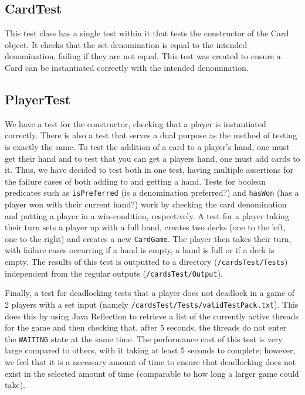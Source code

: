 \documentclass[a4paper, 11pt] {article}
\begin{document}
\subsection*{CardTest}
This test class has a single test within it that tests the constructor of the Card object. It checks that the set denomination is equal to the intended denomination, failing if they are not equal. This test was created to ensure a Card can be instantiated correctly with the intended denomination.

\subsection*{PlayerTest}
We have a test for the constructor, checking that a player is instantiated correctly. There is also a test that serves a dual purpose as the method of testing is exactly the same. To test the addition of a card to a player's hand, one must get their hand and to test that you can get a players hand, one must add cards to it. Thus, we have decided to test both in one test, having multiple assertions for the failure cases of both adding to and getting a hand.
Tests for boolean predicates such as \texttt{isPreferred} (is a denomination preferred?) and \texttt{hasWon} (has a player won with their current hand?) work by checking the card denomination and putting a player in a win-condition, respectively.
A test for a player taking their turn sets a player up with a full hand, creates two decks (one to the left, one to the right) and creates a new \texttt{CardGame}. The player then takes their turn, with failure cases occurring if a hand is empty, a hand is full or if a deck is empty. The results of this test is outputted to a directory (\texttt{/cardsTest/Tests}) independent from the regular outputs (\texttt{/cardsTest/Output}).

Finally, a test for deadlocking tests that a player does not deadlock in a game of 2 players with a set input (namely \texttt{/cardsTest/Tests/validTestPack.txt}). This does this by using Java Reflection to retrieve a list of the currently active threads for the game and then checking that, after 5 seconds, the threads do not enter the \texttt{WAITING} state at the same time. The performance cost of this test is very large compared to others, with it taking at least 5 seconds to complete; however, we feel that it is a necessary amount of time to ensure that deadlocking does not exist in the selected amount of time (comparable to how long a larger game could take).
\end{document}
